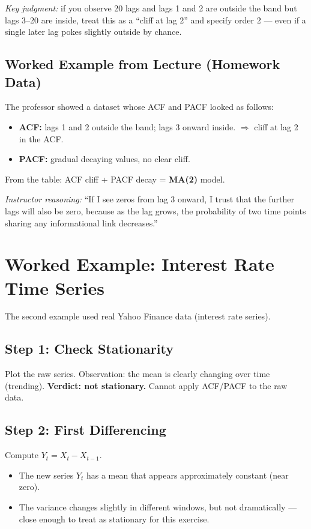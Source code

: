 \documentclass[11pt]{article}
\begin{document}
\textit{Key judgment:} if you observe 20 lags and lags 1 and 2 are outside
the band but lags 3--20 are inside, treat this as a ``cliff at lag 2'' and
specify order 2 --- even if a single later lag pokes slightly outside by
chance.

\subsection{Worked Example from Lecture (Homework Data)}
The professor showed a dataset whose ACF and PACF looked as follows:
\begin{itemize}
    \item \textbf{ACF:} lags 1 and 2 outside the band; lags 3 onward inside.
      $\Rightarrow$ cliff at lag 2 in the ACF.
    \item \textbf{PACF:} gradual decaying values, no clear cliff.
\end{itemize}

From the table: ACF cliff + PACF decay = \textbf{MA(2)} model.

\textit{Instructor reasoning:} ``If I see zeros from lag 3 onward, I trust
that the further lags will also be zero, because as the lag grows, the
probability of two time points sharing any informational link decreases.''


\section{Worked Example: Interest Rate Time Series}

The second example used real Yahoo Finance data (interest rate series).

\subsection{Step 1: Check Stationarity}
Plot the raw series. Observation: the mean is clearly changing over time
(trending). \textbf{Verdict: not stationary.} Cannot apply ACF/PACF to the
raw data.

\subsection{Step 2: First Differencing}
Compute $Y_t = X_t - X_{t-1}$.
\begin{itemize}
    \item The new series $Y_t$ has a mean that appears approximately
      constant (near zero).
    \item The variance changes slightly in different windows, but not
      dramatically --- close enough to treat as stationary for this exercise.
\end{itemize}
\end{document}
